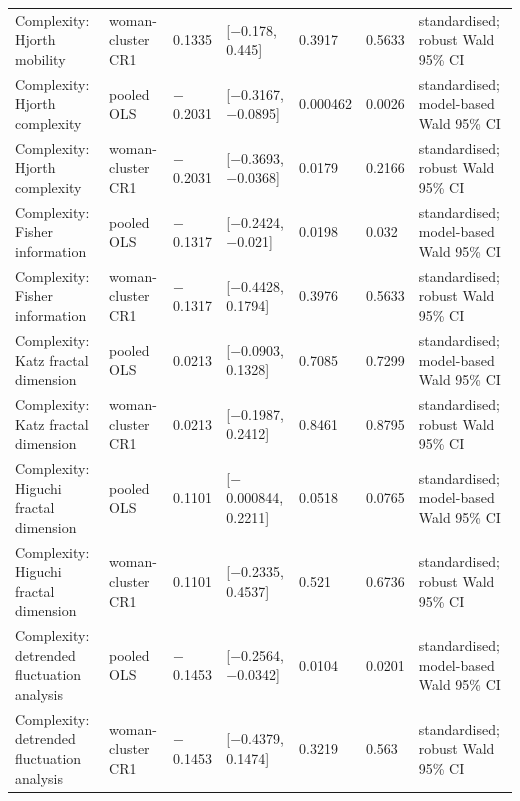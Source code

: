 \documentclass[10pt]{article}
\begin{document}
\begin{landscape}
\begin{longtable}{p{4.0cm}p{3.4cm}p{2.0cm}p{3.4cm}p{1.9cm}p{1.9cm}p{5.2cm}}
Complexity: Hjorth mobility & woman-cluster CR1 & 0.1335 & [$-$0.178, 0.445] & 0.3917 & 0.5633 & standardised; robust Wald 95\% CI \\
Complexity: Hjorth complexity & pooled OLS & $-$0.2031 & [$-$0.3167, $-$0.0895] & 0.000462 & 0.0026 & standardised; model-based Wald 95\% CI \\
Complexity: Hjorth complexity & woman-cluster CR1 & $-$0.2031 & [$-$0.3693, $-$0.0368] & 0.0179 & 0.2166 & standardised; robust Wald 95\% CI \\
Complexity: Fisher information & pooled OLS & $-$0.1317 & [$-$0.2424, $-$0.021] & 0.0198 & 0.032 & standardised; model-based Wald 95\% CI \\
Complexity: Fisher information & woman-cluster CR1 & $-$0.1317 & [$-$0.4428, 0.1794] & 0.3976 & 0.5633 & standardised; robust Wald 95\% CI \\
Complexity: Katz fractal dimension & pooled OLS & 0.0213 & [$-$0.0903, 0.1328] & 0.7085 & 0.7299 & standardised; model-based Wald 95\% CI \\
Complexity: Katz fractal dimension & woman-cluster CR1 & 0.0213 & [$-$0.1987, 0.2412] & 0.8461 & 0.8795 & standardised; robust Wald 95\% CI \\
Complexity: Higuchi fractal dimension & pooled OLS & 0.1101 & [$-$0.000844, 0.2211] & 0.0518 & 0.0765 & standardised; model-based Wald 95\% CI \\
Complexity: Higuchi fractal dimension & woman-cluster CR1 & 0.1101 & [$-$0.2335, 0.4537] & 0.521 & 0.6736 & standardised; robust Wald 95\% CI \\
Complexity: detrended fluctuation analysis & pooled OLS & $-$0.1453 & [$-$0.2564, $-$0.0342] & 0.0104 & 0.0201 & standardised; model-based Wald 95\% CI \\
Complexity: detrended fluctuation analysis & woman-cluster CR1 & $-$0.1453 & [$-$0.4379, 0.1474] & 0.3219 & 0.563 & standardised; robust Wald 95\% CI \\
\bottomrule
\end{longtable}
\medskip

\end{landscape}
\end{document}
